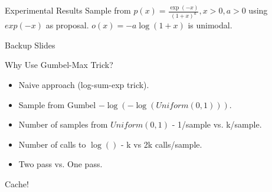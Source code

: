 \begin{frame}{Experimental Results}
  Sample from $p(x)=\frac{\exp(-x)}{(1+x)^a},x>0,a>0$ using $exp(-x)$ as proposal.
  $o(x) = -a\log(1+x)$ is unimodal. 
\end{frame}

\begin{frame}
  Backup Slides
\end{frame}

\begin{frame}{Why Use Gumbel-Max Trick?}
  \begin{itemize}[<+->]
  \item Naive approach (log-sum-exp trick).
  \item Sample from Gumbel $-\log(-\log(Uniform(0,1)))$.
  \item Number of samples from $Uniform(0,1)$ - 1/sample vs. k/sample.
  \item Number of calls to $\log()$ - k vs 2k calls/sample.
  \item Two pass vs. One pass.
  \end{itemize}
  \begin{center}
    Cache!
  \end{center}
\end{frame}

